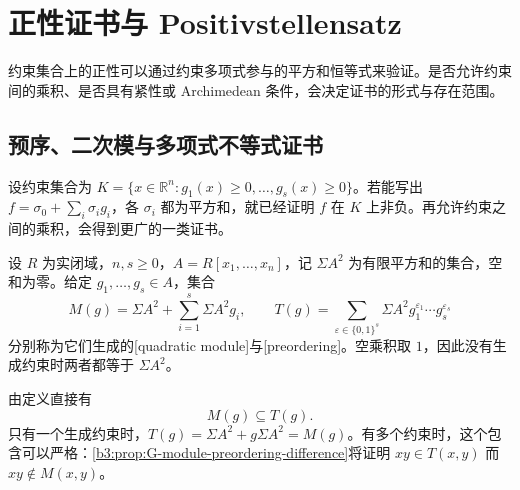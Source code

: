 
\section{正性证书与 Positivstellensatz}
\label{b3:sec:G04}

约束集合上的正性可以通过约束多项式参与的平方和恒等式来验证。是否允许约束间的乘积、是否具有紧性或 Archimedean 条件，会决定证书的形式与存在范围。


\subsection{预序、二次模与多项式不等式证书}
\label{b3:subsec:G04:01}

设约束集合为 \(K=\{x\in\mathbb R^n:g_1(x)\ge0,\ldots,g_s(x)\ge0\}\)。若能写出 \(f=\sigma_0+\sum_i\sigma_i g_i\)，各 \(\sigma_i\) 都为平方和，就已经证明 \(f\) 在 \(K\) 上非负。再允许约束之间的乘积，会得到更广的一类证书。

\begin{definition}\label{b3:def:preordering-quadratic-module}
	设 \(R\) 为实闭域，\(n,s\ge0\)，\(A=R[x_1,\ldots,x_n]\)，记 \(\Sigma A^2\) 为有限平方和的集合，空和为零。给定 \(g_1,\ldots,g_s\in A\)，集合
	\[
		M(g)=\Sigma A^2+\sum_{i=1}^s\Sigma A^2g_i, \qquad T(g)=\sum_{\varepsilon\in\{0,1\}^s}\Sigma A^2g_1^{\varepsilon_1}\cdots g_s^{\varepsilon_s}
	\]
	分别称为它们生成的[quadratic module]与[preordering]。空乘积取 \(1\)，因此没有生成约束时两者都等于 \(\Sigma A^2\)。
\end{definition}

由定义直接有
\[
	M(g)\subseteq T(g).
\]
只有一个生成约束时，\(T(g)=\Sigma A^2+g\Sigma A^2=M(g)\)。有多个约束时，这个包含可以严格：\cref{b3:prop:G-module-preordering-difference}将证明 \(xy\in T(x,y)\) 而 \(xy\notin M(x,y)\)。

